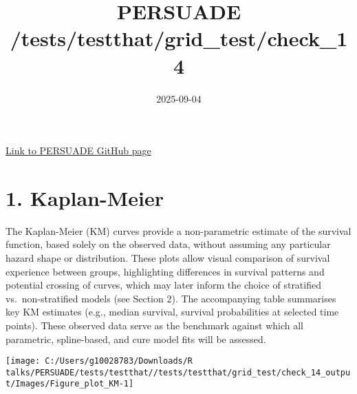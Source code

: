 \documentclass[
]{article}
\title{PERSUADE /tests/testthat/grid\_test/check\_14}
\author{}
\date{\vspace{-2.5em}2025-09-04}
\begin{document}
\maketitle

{
\hypersetup{linkcolor=}
\setcounter{tocdepth}{2}
\tableofcontents
}
\hfill\break

\href{https://github.com/Bram-R/PERSUADE}{Link to PERSUADE GitHub page}

\clearpage

\section{1. Kaplan-Meier}\label{kaplan-meier}

The Kaplan-Meier (KM) curves provide a non-parametric estimate of the
survival function, based solely on the observed data, without assuming
any particular hazard shape or distribution. These plots allow visual
comparison of survival experience between groups, highlighting
differences in survival patterns and potential crossing of curves, which
may later inform the choice of stratified vs.~non-stratified models (see
Section 2). The accompanying table summarises key KM estimates (e.g.,
median survival, survival probabilities at selected time points). These
observed data serve as the benchmark against which all parametric,
spline-based, and cure model fits will be assessed.

\clearpage

\begin{flushleft}\texttt{[image: C:/Users/g10028783/Downloads/R talks/PERSUADE/tests/testthat//tests/testthat/grid\_test/check\_14\_output/Images/Figure\_plot\_KM-1]} \end{flushleft}

\begin{table}[H]
\centering
\caption{\label{tab:Table_1}Observed survival data}
\centering
{}
\end{table}
\end{document}
